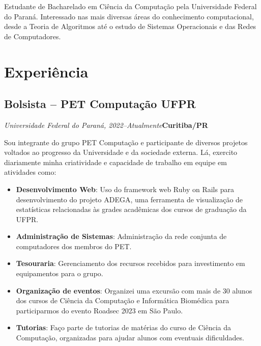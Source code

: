 \documentclass[a4paper, 12pt]{moderncv}
\begin{document}
\makecvtitle

\small{Estudante de Bacharelado em Ciência da Computação pela Universidade
Federal do Paraná. Interessado nas mais diversas áreas do conhecimento
computacional, desde a Teoria de Algoritmos até o estudo de Sistemas
Operacionais e das Redes de Computadores.}

\section{Experiência}
\vspace{1pt}
\subsection{\small{Bolsista -- PET Computação UFPR}}
\textit{Universidade Federal do Paraná, 2022--Atualmente}\hspace{182pt}\textbf{Curitiba/PR}

\vspace{3pt}
Sou integrante do grupo PET Computação e participante de diversos projetos
voltados ao progresso da Universidade e da sociedade externa. Lá, exercito
diariamente minha criatividade e capacidade de trabalho em equipe em
atividades como:
\vspace{4pt}
\begin{itemize}
    \item{\textbf{Desenvolvimento Web}: Uso do framework web Ruby on Rails para
          desenvolvimento do projeto ADEGA, uma ferramenta de visualização de
          estatísticas relacionadas às grades acadêmicas dos cursos de graduação da
          UFPR.}
    \item{\textbf{Administração de Sistemas}: Administração da rede
          conjunta de computadores dos membros do PET.}
    \item{\textbf{Tesouraria}: Gerenciamento dos recursos recebidos para investimento
          em equipamentos para o grupo.}
    \item{\textbf{Organização de eventos}: Organizei uma excursão com mais de
          30 alunos dos cursos de Ciência da Computação e Informática Biomédica
          para participarmos do evento Roadsec 2023 em São Paulo.}
    \item{\textbf{Tutorias}: Faço parte de tutorias de matérias do curso de Ciência
          da Computação, organizadas para ajudar alunos com eventuais dificuldades.}
\end{itemize}

\vspace{4pt}
\end{document}
